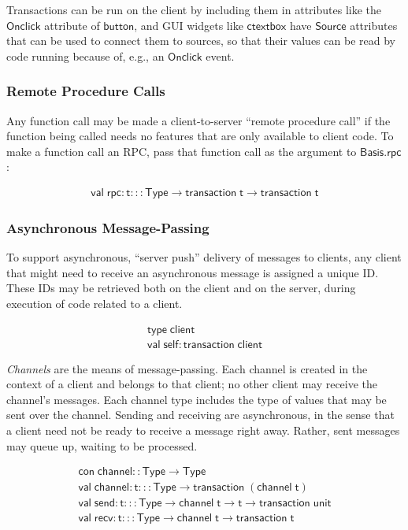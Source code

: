 \documentclass{article}
\newcommand{\mt}[1]{\mathsf{#1}}
\begin{document}
Transactions can be run on the client by including them in attributes like the $\mt{Onclick}$ attribute of $\mt{button}$, and GUI widgets like $\mt{ctextbox}$ have $\mt{Source}$ attributes that can be used to connect them to sources, so that their values can be read by code running because of, e.g., an $\mt{Onclick}$ event.

\subsubsection{Remote Procedure Calls}

Any function call may be made a client-to-server ``remote procedure call'' if the function being called needs no features that are only available to client code.  To make a function call an RPC, pass that function call as the argument to $\mt{Basis.rpc}$:

$$\begin{array}{l}
  \mt{val} \; \mt{rpc} : \mt{t} ::: \mt{Type} \to \mt{transaction} \; \mt{t} \to \mt{transaction} \; \mt{t}
\end{array}$$

\subsubsection{Asynchronous Message-Passing}

To support asynchronous, ``server push'' delivery of messages to clients, any client that might need to receive an asynchronous message is assigned a unique ID.  These IDs may be retrieved both on the client and on the server, during execution of code related to a client.

$$\begin{array}{l}
  \mt{type} \; \mt{client} \\
  \mt{val} \; \mt{self} : \mt{transaction} \; \mt{client}
\end{array}$$

\emph{Channels} are the means of message-passing.  Each channel is created in the context of a client and belongs to that client; no other client may receive the channel's messages.  Each channel type includes the type of values that may be sent over the channel.  Sending and receiving are asynchronous, in the sense that a client need not be ready to receive a message right away.  Rather, sent messages may queue up, waiting to be processed.

$$\begin{array}{l}
  \mt{con} \; \mt{channel} :: \mt{Type} \to \mt{Type} \\
  \mt{val} \; \mt{channel} : \mt{t} ::: \mt{Type} \to \mt{transaction} \; (\mt{channel} \; \mt{t}) \\
  \mt{val} \; \mt{send} : \mt{t} ::: \mt{Type} \to \mt{channel} \; \mt{t} \to \mt{t} \to \mt{transaction} \; \mt{unit} \\
  \mt{val} \; \mt{recv} : \mt{t} ::: \mt{Type} \to \mt{channel} \; \mt{t} \to \mt{transaction} \; \mt{t}
\end{array}$$
\end{document}
